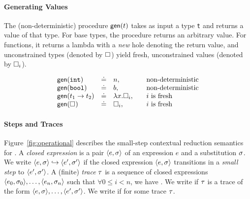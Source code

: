 \paragraph{Generating Values} The (non-deterministic) procedure $\mathsf{gen}(t)$
takes as input a type \texttt{t} and returns a value of that type. For base
types, the procedure returns an arbitrary value. For functions, it returns
a lambda with a \emph{new} hole denoting the return value, and unconstrained
types (denoted by $\square_{}$) yield fresh, unconstrained values
(denoted by $\square_{i}$).

$$
\begin{array}{lcll}
\mathsf{gen}(\mathtt{int})   & \doteq  & n, & \quad \text{non-deterministic} \\
\mathsf{gen}(\mathtt{bool})  & \doteq  & b, & \quad \text{non-deterministic} \\
\mathsf{gen}({t_1} \rightarrow t_2)   & \doteq & \lambda x. \square_{i}, & \quad \text{$i$ is fresh} \\
\mathsf{gen}(\square_{}) & \doteq & \square_{i}, & \quad \text{$i$ is fresh} \\
\end{array}
$$

\paragraph{Steps and Traces}
%
Figure~\ref{fig:operational} describes the small-step contextual
reduction semantics for \lang.
%
A \emph{closed expression} is a pair $\langle e, \sigma \rangle$ of an expression $e$
and a substitution $\sigma$.
%
We write $\langle e, \sigma \rangle \hookrightarrow \langle e', \sigma' \rangle$ if the closed expression $\langle e, \sigma \rangle$
transitions in a \emph{small step} to $\langle e', \sigma' \rangle$.
%
A (finite) \emph{trace} $\tau$ is a sequence of closed expressions
$\langle e_0, \sigma_0 \rangle, \ldots, \langle e_n, \sigma_n \rangle$ such that
$\forall 0 \leq i < n$, we have .
%
We write  if $\tau$ is a trace of the form
$\langle e, \sigma \rangle,\ldots,\langle e', \sigma' \rangle$.
%
We write  if 
for some trace $\tau$.

